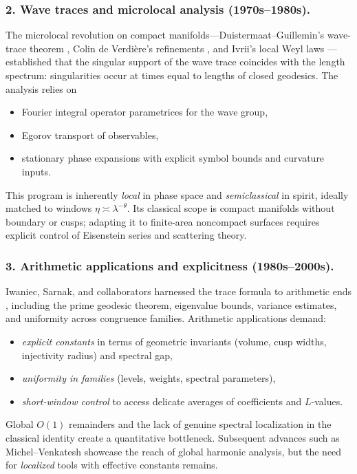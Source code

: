 \medskip

\subsubsection*{2. Wave traces and microlocal analysis (1970s–1980s).}
The microlocal revolution on compact manifolds—Duistermaat–Guillemin’s wave-trace theorem \cite{DG1975},
Colin de Verdière’s refinements \cite{Colin1978}, and Ivrii’s local Weyl laws \cite{Ivrii1980}—
established that the singular support of the wave trace coincides with the length spectrum:
singularities occur at times equal to lengths of closed geodesics.
The analysis relies on
\begin{itemize}
  \item Fourier integral operator parametrices for the wave group,
  \item Egorov transport of observables,
  \item stationary phase expansions with explicit symbol bounds and curvature inputs.
\end{itemize}
This program is inherently \emph{local} in phase space and \emph{semiclassical} in spirit, ideally matched to windows
$\eta\asymp\lambda^{-\theta}$.
Its classical scope is compact manifolds without boundary or cusps; adapting it to
finite-area noncompact surfaces requires explicit control of Eisenstein series and scattering theory.

\medskip

\subsubsection*{3. Arithmetic applications and explicitness (1980s–2000s).}
Iwaniec, Sarnak, and collaborators harnessed the trace formula to arithmetic ends
\cite{Iwaniec2002,LuoSarnak1995}, including the prime geodesic theorem,
eigenvalue bounds, variance estimates, and uniformity across congruence families.
Arithmetic applications demand:
\begin{itemize}
  \item \emph{explicit constants} in terms of geometric invariants (volume, cusp widths, injectivity radius) and spectral gap,
  \item \emph{uniformity in families} (levels, weights, spectral parameters),
  \item \emph{short-window control} to access delicate averages of coefficients and $L$-values.
\end{itemize}
Global $O(1)$ remainders and the lack of genuine spectral localization in the classical identity create a quantitative bottleneck.
Subsequent advances such as Michel–Venkatesh \cite{MichelVenkatesh2010} showcase the reach of global harmonic analysis,
but the need for \emph{localized} tools with effective constants remains.

